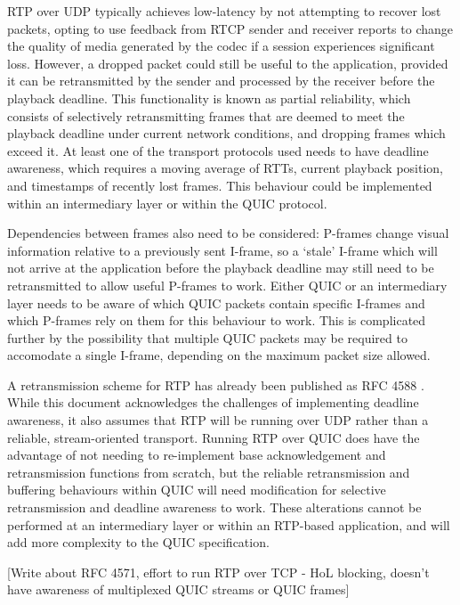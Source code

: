 \documentclass{mprop}
\begin{document}
RTP over UDP typically achieves low-latency by not attempting to recover lost packets, opting to use feedback from RTCP sender and receiver reports to change the quality of media generated by the codec if a session experiences significant loss. However, a dropped packet could still be useful to the application, provided it can be retransmitted by the sender and processed by the receiver before the playback deadline. This functionality is known as partial reliability, which consists of selectively retransmitting frames that are deemed to meet the playback deadline under current network conditions, and dropping frames which exceed it. At least one of the transport protocols used needs to have deadline awareness, which requires a moving average of RTTs, current playback position, and timestamps of recently lost frames. This behaviour could be implemented within an intermediary layer or within the QUIC protocol.

Dependencies between frames also need to be considered: P-frames change visual information relative to a previously sent I-frame, so a `stale' I-frame which will not arrive at the application before the playback deadline may still need to be retransmitted to allow useful P-frames to work. Either QUIC or an intermediary layer needs to be aware of which QUIC packets contain specific I-frames and which P-frames rely on them for this behaviour to work. This is complicated further by the possibility that multiple QUIC packets may be required to accomodate a single I-frame, depending on the maximum packet size allowed.

A retransmission scheme for RTP has already been published as RFC 4588 \cite{RTP-retransmission-RFC}. While this document acknowledges the challenges of implementing deadline awareness, it also assumes that RTP will be running over UDP rather than a reliable, stream-oriented transport. Running RTP over QUIC does have the advantage of not needing to re-implement base acknowledgement and retransmission functions from scratch, but the reliable retransmission and buffering behaviours within QUIC will need modification for selective retransmission and deadline awareness to work. These alterations cannot be performed at an intermediary layer or within an RTP-based application, and will add more complexity to the QUIC specification.

[Write about RFC 4571, effort to run RTP over TCP - HoL blocking, doesn't have awareness of multiplexed QUIC streams or QUIC frames]
\end{document}
